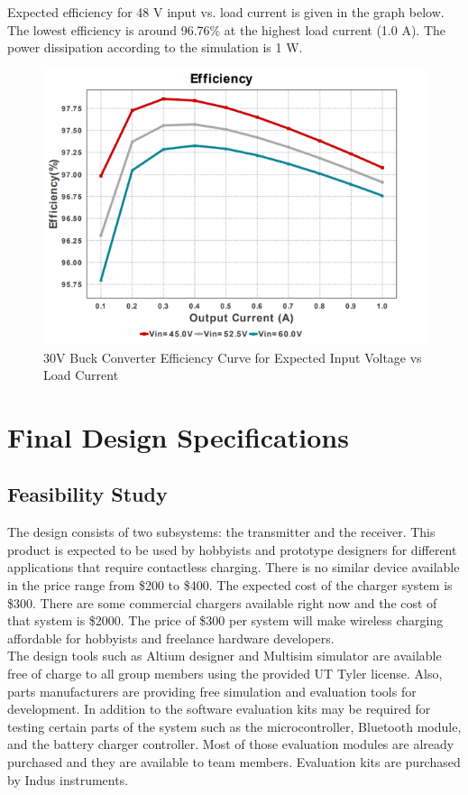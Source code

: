 \documentclass[12pt]{article}
\begin{document}
\noindent
Expected efficiency for 48 V input vs. load current is given in the graph below. The lowest efficiency is around 96.76\% at the highest load current (1.0 A). The power dissipation according to the simulation is 1 W.

\begin{figure}[h!]
\centering
\includegraphics[width=0.9\linewidth]{48V_eff}
\caption{30V Buck Converter Efficiency Curve for Expected Input Voltage vs Load Current}
\end{figure}

\section{Final Design Specifications}
\subsection{Feasibility Study}

\indent \indent
The design consists of two subsystems: the transmitter and the receiver. This product is expected to be used by hobbyists and prototype designers for different applications that require contactless charging. There is no similar device available in the price range from \$200 to \$400.  The expected cost of the charger system is \$300. There are some commercial chargers available right now and the cost of that system is \$2000. The price of \$300 per system will make wireless charging affordable for hobbyists and freelance hardware developers.\\

\indent
The design tools such as Altium designer and Multisim simulator are available free of charge to all group members using the provided UT Tyler license. Also, parts manufacturers are providing free simulation and evaluation tools for development. In addition to the software evaluation kits may be required for testing certain parts of the system such as the microcontroller, Bluetooth module, and the battery charger controller. Most of those evaluation modules are already purchased and they are available to team members. Evaluation kits are purchased by Indus instruments.\\
\end{document}
